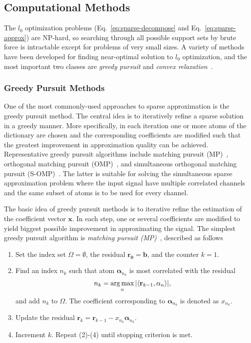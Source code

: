 \subsection{Computational Methods}
The $l_0$ optimization problems (Eq.~\ref{eq:sparse-decompose} and Eq.~\ref{eq:sparse-approx}) are NP-hard,
so searching through all possible support sets by brute force is intractable except for problems of very small
sizes. A variety of methods have been developed for finding near-optimal solution to $l_0$ optimization, and
the most important two classes are \emph{greedy pursuit} and \emph{convex relaxation}~\cite{Tropp2010}.

\subsubsection*{Greedy Pursuit Methods}
One of the most commonly-used approaches to sparse approximation is
the greedy pursuit method. The central idea is to iteratively refine a
sparse solution in a greedy manner. More specifically, in each
iteration one or more atoms of the dictionary are chosen
and the corresponding coefficients are modified
such that the greatest improvement in approximation quality can be achieved.
Representative greedy pursuit algorithms include matching pursuit
(MP)~\cite{Mallat1993}, orthogonal matching pursuit
(OMP)~\cite{Pati1993}, and simultaneous orthogonal matching pursuit (S-OMP)~\cite{Tropp2006a}.
The latter is suitable for solving the simultaneous sparse approximation problem where
the input signal have multiple correlated channels and the same subset of atoms is to be used
for every channel.


The basic idea of greedy pursuit methods is to iterative refine the estimation of the coefficient vector
$\mathbf{x}$. In each step, one or several coefficients are modified to yield biggest possible improvement
in approximating the signal. The simplest greedy pursuit algorithm is \emph{matching pursuit (MP)}~\cite{Mallat1993},
described as follows
\begin{enumerate}
\item Set the index set $\Omega=\emptyset$, the residual $\mathbf{r_0} = \mathbf{b}$, and the counter $k=1$.
\item Find an index $n_k$ such that atom $\mathbf{\alpha}_{n_k}$ is most correlated with the residual
\begin{equation*}
n_k = \operatorname*{arg\,max}_n |\langle \mathbf{r}_{k-1},\mathbf{\alpha}_{n} \rangle|,
\end{equation*}
and add $n_k$ to $\Omega$. The coefficient corresponding to $\mathbf{\alpha}_{n_k}$ is denoted as $x_{n_k}$.

\item Update the residual $\mathbf{r}_k = \mathbf{r}_{k-1} - x_{n_k} \mathbf{\alpha}_{n_k}$.
\item Increment $k$. Repeat (2)-(4) until stopping criterion is met.
\end{enumerate}

